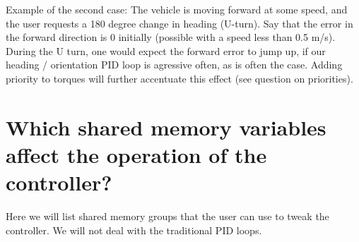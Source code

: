 \documentclass[11pt]{article}
\newcommand{\question}[1] %
{
  \section{#1}
}
\begin{document}
\begin{itemize}
        Example of the second case: The vehicle is moving forward at some speed, and the user requests a 180 degree change in heading (U-turn). Say that the error in the forward direction is 0 initially (possible with a speed less than 0.5 m/s). During the U turn, one would expect the forward error to jump up, if our heading / orientation PID loop is agressive often, as is often the case. Adding priority to torques will further accentuate this effect (see question on priorities).\\

\end{itemize}

\question{Which shared memory variables affect the operation of the controller?}

    Here we will list shared memory groups that the user can use to tweak the controller. We will not deal with the traditional PID loops.
\end{document}
